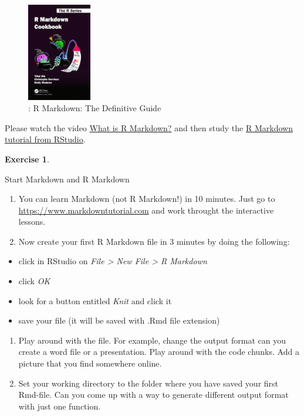 \documentclass[
  12pt,
  oneside]{book}
\providecommand{\tightlist}{%
  \setlength{\itemsep}{0pt}\setlength{\parskip}{0pt}}
\theoremstyle{definition}
\theoremstyle{definition}
\theoremstyle{definition}
\newtheorem{exercise}{Exercise}[chapter]
\theoremstyle{definition}
\theoremstyle{remark}
\begin{document}
\begin{figure}
\centering
\includegraphics[width=0.25\textwidth,height=\textheight]{fig/rmcb.png}
\caption{\citet{Xie2018R}: R Markdown: The Definitive Guide}
\end{figure}

Please watch the video \href{https://vimeo.com/178485416}{What is R Markdown?} and then study the \href{https://rmarkdown.rstudio.com/lesson-1.html}{R Markdown tutorial from RStudio}.

\begin{exercise}
\protect\hypertarget{exr:rmdfirst}{}\label{exr:rmdfirst}

Start Markdown and R Markdown

\begin{enumerate}
\def\labelenumi{\alph{enumi})}
\tightlist
\item
  You can learn Markdown (not R Markdown!) in 10 minutes. Just go to \url{https://www.markdowntutorial.com} and work throught the interactive lessons.
\item
  Now create your first R Markdown file in 3 minutes by doing the following:
\end{enumerate}

\begin{itemize}
\tightlist
\item
  click in RStudio on \emph{File \textgreater{} New File \textgreater{} R Markdown}
\item
  click \emph{OK}
\item
  look for a button entitled \emph{Knit} and click it
\item
  save your file (it will be saved with .Rmd file extension)
\end{itemize}

\begin{enumerate}
\def\labelenumi{\alph{enumi})}
\setcounter{enumi}{2}
\tightlist
\item
  Play around with the file. For example, change the output format can you create a word file or a presentation. Play around with the code chunks. Add a picture that you find somewhere online.
\item
  Set your working directory to the folder where you have saved your first Rmd-file. Can you come up with a way to generate different output format with just one function.
\end{enumerate}

\end{exercise}
\end{document}
